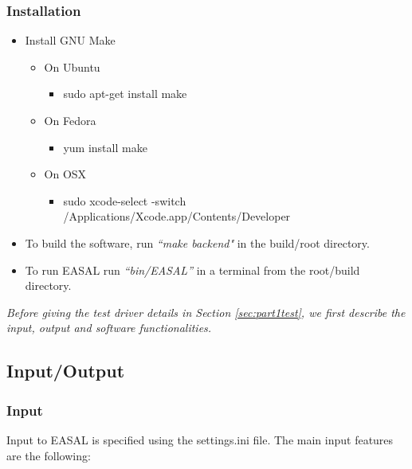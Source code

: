\documentclass[10pt]{article}
\begin{document}
 
\subsubsection{Installation}
\begin{itemize}
	 \item Install GNU Make
	   \begin{itemize}
	   	   \item On Ubuntu 
	   	   \begin{itemize}
			\item sudo apt-get install make
		   \end{itemize}	
		   \item On Fedora
		   \begin{itemize}
			\item yum install make
		   \end{itemize}
		   \item On OSX
		   \begin{itemize}
		   \item sudo xcode-select -switch /Applications/Xcode.app/Contents/Developer
		   \end{itemize}
		   \end{itemize}
	 
	 \item To build the software, run \emph{``make backend"} in the build/root directory.
	 \item To run EASAL run \emph{``bin/EASAL''} in a terminal from the root/build directory.
\end{itemize}%

\emph{Before giving the test driver details in Section \ref{sec:part1test}, we first describe the input, output and software functionalities.}

\subsection{Input/Output}
\label{sec:part1io}
\subsubsection{Input}
Input to EASAL is specified using the settings.ini file. The main input features are the following:
\end{document}
